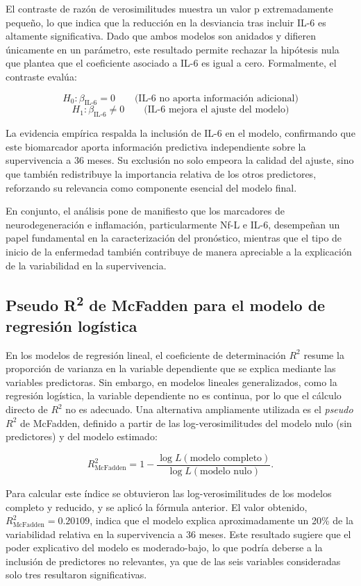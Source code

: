 \documentclass[12pt]{article} %
\begin{document}
El contraste de razón de verosimilitudes muestra un valor p extremadamente pequeño, lo que indica que la reducción en la desviancia tras incluir IL-6 es altamente significativa. Dado que ambos modelos son anidados y difieren únicamente en un parámetro, este resultado permite rechazar la hipótesis nula que plantea que el coeficiente asociado a IL-6 es igual a cero. Formalmente, el contraste evalúa:

\[
H_0: \beta_{\text{IL-6}} = 0 \qquad \text{(IL-6 no aporta información adicional)}
\]
\[
H_1: \beta_{\text{IL-6}} \neq 0 \qquad \text{(IL-6 mejora el ajuste del modelo)}
\]

La evidencia empírica respalda la inclusión de IL-6 en el modelo, confirmando que este biomarcador aporta información predictiva independiente sobre la supervivencia a 36 meses. Su exclusión no solo empeora la calidad del ajuste, sino que también redistribuye la importancia relativa de los otros predictores, reforzando su relevancia como componente esencial del modelo final.

En conjunto, el análisis pone de manifiesto que los marcadores de neurodegeneración e inflamación, particularmente Nf-L e IL-6, desempeñan un papel fundamental en la caracterización del pronóstico, mientras que el tipo de inicio de la enfermedad también contribuye de manera apreciable a la explicación de la variabilidad en la supervivencia.

\subsection{Pseudo R\textsuperscript{2} de McFadden para el modelo de regresión logística}

En los modelos de regresión lineal, el coeficiente de determinación $R^2$ resume la proporción de varianza en la variable dependiente que se explica mediante las variables predictoras. Sin embargo, en modelos lineales generalizados, como la regresión logística, la variable dependiente no es continua, por lo que el cálculo directo de $R^2$ no es adecuado. Una alternativa ampliamente utilizada es el \textit{pseudo} $R^2$ de McFadden, definido a partir de las log-verosimilitudes del modelo nulo (sin predictores) y del modelo estimado:

\[
R^2_{\text{McFadden}} = 1 - \frac{\log L(\text{modelo completo})}{\log L(\text{modelo nulo})}.
\]

Para calcular este índice se obtuvieron las log-verosimilitudes de los modelos completo y reducido, y se aplicó la fórmula anterior. El valor obtenido, $R^2_{\text{McFadden}} = 0.20109$, indica que el modelo explica aproximadamente un 20\% de la variabilidad relativa en la supervivencia a 36 meses. Este resultado sugiere que el poder explicativo del modelo es moderado-bajo, lo que podría deberse a la inclusión de predictores no relevantes, ya que de las seis variables consideradas solo tres resultaron significativas.
\end{document}
